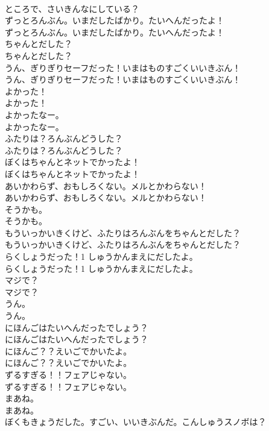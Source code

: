 \documentclass[8pt]{extreport}
\begin{document}
\begin{CJK}{UTF8}{min}
\\	ところで、さいきんなにしている？
\\	ずっとろんぶん。いまだしたばかり。たいへんだったよ！
\\	ずっとろんぶん。いまだしたばかり。たいへんだったよ！
\\	ちゃんとだした？
\\	ちゃんとだした？
\\	うん、ぎりぎりセーフだった！いまはものすごくいいきぶん！
\\	うん、ぎりぎりセーフだった！いまはものすごくいいきぶん！
\\	よかった！
\\	よかった！
\\	よかったなー。
\\	よかったなー。
\\	ふたりは？ろんぶんどうした？
\\	ふたりは？ろんぶんどうした？
\\	ぼくはちゃんとネットでかったよ！
\\	ぼくはちゃんとネットでかったよ！
\\	あいかわらず、おもしろくない。メルとかわらない！
\\	あいかわらず、おもしろくない。メルとかわらない！
\\	そうかも。
\\	そうかも。
\\	もういっかいきくけど、ふたりはろんぶんをちゃんとだした？
\\	もういっかいきくけど、ふたりはろんぶんをちゃんとだした？
\\	らくしょうだった！1 しゅうかんまえにだしたよ。
\\	らくしょうだった！1 しゅうかんまえにだしたよ。
\\	マジで？
\\	マジで？
\\	うん。
\\	うん。
\\	にほんごはたいへんだったでしょう？
\\	にほんごはたいへんだったでしょう？
\\	にほんご？？えいごでかいたよ。
\\	にほんご？？えいごでかいたよ。
\\	ずるすぎる！！フェアじゃない。
\\	ずるすぎる！！フェアじゃない。
\\	まあね。
\\	まあね。
\\	ぼくもきょうだした。すごい、いいきぶんだ。こんしゅうスノボは？

\end{CJK}
\end{document}
